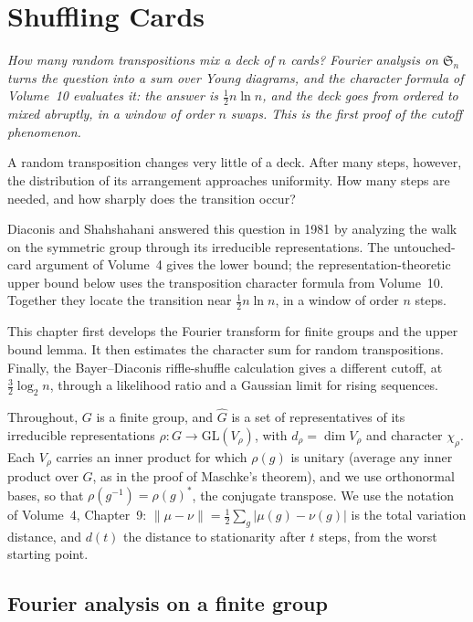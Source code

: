\chapter{Shuffling Cards}\label{ch:shuffling}

\begin{center}\itshape
How many random transpositions mix a deck of $n$ cards? Fourier analysis on $\mathfrak S_n$ turns the question into a sum over Young diagrams, and the character formula of Volume~10 evaluates it: the answer is $\frac12n\ln n$, and the deck goes from ordered to
mixed abruptly, in a window of order $n$ swaps. This is the first proof of the cutoff phenomenon.
\end{center}

A random transposition changes very little of a deck. After many steps, however, the distribution of its arrangement approaches uniformity. How many steps are needed, and how sharply does the transition occur?

Diaconis and Shahshahani answered this question in 1981 by analyzing the walk on the symmetric group through its irreducible representations. The untouched-card argument of Volume~4 gives the lower bound; the representation-theoretic upper bound below uses the transposition character formula from Volume~10. Together they locate the transition near $\frac12n\ln n$, in a window of order $n$ steps.

This chapter first develops the Fourier transform for finite groups and the upper bound lemma. It then estimates the character sum for random transpositions. Finally, the Bayer--Diaconis riffle-shuffle calculation gives a different cutoff, at $\frac32\log_2 n$, through a likelihood ratio and a Gaussian limit for rising sequences.

Throughout, $G$ is a finite group, and $\widehat G$ is a set of representatives of its irreducible representations $\rho:G\to\mathrm{GL}(V_\rho)$, with $d_\rho=\dim V_\rho$ and character $\chi_\rho$. Each $V_\rho$ carries an inner product for which $\rho(g)$ is unitary (average any inner product
over $G$, as in the proof of Maschke's theorem), and we use orthonormal bases, so that $\rho(g^{-1})=\rho(g)^*$, the conjugate transpose. We use the notation of Volume~4, Chapter~9: $\|\mu-\nu\|=\frac12\sum_g|\mu(g)-\nu(g)|$ is the total variation distance, and $d(t)$ the
distance to stationarity after $t$ steps, from the worst starting point.

\section{Fourier analysis on a finite group}

